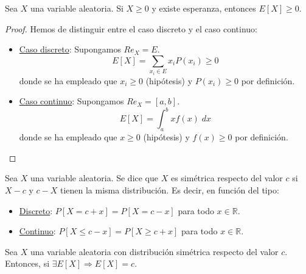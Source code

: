 \begin{prop}\label{prop:6.4}
    Sea $X$ una variable aleatoria. Si $X\geq 0$ y existe esperanza, entonces $E[X]\geq 0$.
\end{prop}
\begin{proof}
    Hemos de distinguir entre el caso discreto y el caso continuo:
    \begin{itemize}
        \item \underline{Caso discreto}: Supongamos $Re_X = E$.
        \begin{equation*}
            E[X] = \sum_{x_i\in E} x_iP(x_i) \geq 0
        \end{equation*}
        donde se ha empleado que $x_i\geq 0$ (hipótesis) y $P(x_i)\geq0$ por definición.

        \item \underline{Caso continuo}: Supongamos $Re_X = [a,b]$.
        \begin{equation*}
            E[X] = \int_a^b xf(x)\;dx
        \end{equation*}
        donde se ha empleado que $x\geq 0$ (hipótesis) y $f(x)\geq0$ por definición.
    \end{itemize}
\end{proof}

\begin{definicion}
    Sea $X$ una variable aleatoria. Se dice que $X$ es simétrica respecto del valor $c$ si $X-c$ y $c-X$ tienen la misma distribución.
    Es decir, en función del tipo:
    \begin{itemize}
        \item \underline{Discreto}: $P[X=c+x]=P[X=c-x]$ para todo $x\in \mathbb{R}$.
        \item \underline{Continuo}: $P[X\leq c-x]=P[X\geq c+x]$ para todo $x\in \mathbb{R}$.
    \end{itemize}
\end{definicion}

\begin{prop}
    Sea $X$ una variable aleatoria con distribución simétrica respecto del valor $c$. Entonces, si $\exists E[X]\Longrightarrow E[X]=c$.
\end{prop}

